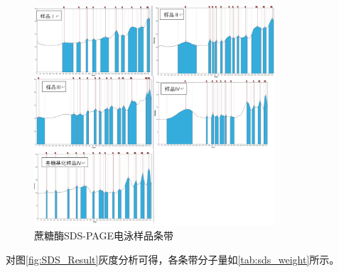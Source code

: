 
\begin{figure}[H]
     \centering
     \label{fig:4.6.1}
     \includegraphics[width = 0.8\textwidth]{figure/Electro/sds 条带.png}
     \caption{蔗糖酶SDS-PAGE电泳样品条带}
\end{figure}

对图\ref{fig:SDS_Result}灰度分析可得，各条带分子量如\autoref{tab:sds_weight}所示。

